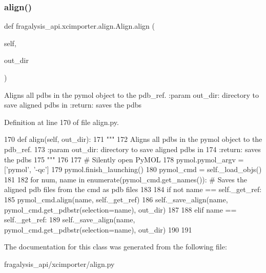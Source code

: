 \subsubsection{\texorpdfstring{align()}{align()}}
{\footnotesize\ttfamily def fragalysis\+\_\+api.\+xcimporter.\+align.\+Align.\+align (\begin{DoxyParamCaption}\item[{}]{self,  }\item[{}]{out\+\_\+dir }\end{DoxyParamCaption})}

\begin{DoxyVerb}Aligns all pdbs in the pymol object to the pdb_ref.
:param out_dir: directory to save aligned pdbs in
:return: saves the pdbs
\end{DoxyVerb}
 

Definition at line 170 of file align.\+py.


\begin{DoxyCode}
170     \textcolor{keyword}{def }align(self, out\_dir):
171         \textcolor{stringliteral}{"""}
172 \textcolor{stringliteral}{        Aligns all pdbs in the pymol object to the pdb\_ref.}
173 \textcolor{stringliteral}{        :param out\_dir: directory to save aligned pdbs in}
174 \textcolor{stringliteral}{        :return: saves the pdbs}
175 \textcolor{stringliteral}{        """}
176 
177         \textcolor{comment}{# Silently open PyMOL}
178         pymol.pymol\_argv = [\textcolor{stringliteral}{'pymol'}, \textcolor{stringliteral}{'-qc'}]
179         pymol.finish\_launching()
180         pymol\_cmd = self.\_load\_objs()
181 
182         \textcolor{keywordflow}{for} num, name \textcolor{keywordflow}{in} enumerate(pymol\_cmd.get\_names()):  \textcolor{comment}{# Saves the aligned pdb files from the cmd as
       pdb files}
183 
184             \textcolor{keywordflow}{if} \textcolor{keywordflow}{not} name == self.\_get\_ref:
185                 pymol\_cmd.align(name, self.\_get\_ref)
186                 self.\_save\_align(name, pymol\_cmd.get\_pdbstr(selection=name), out\_dir)
187 
188             \textcolor{keywordflow}{elif} name == self.\_get\_ref:
189                 self.\_save\_align(name, pymol\_cmd.get\_pdbstr(selection=name), out\_dir)
190 
191 
\end{DoxyCode}


The documentation for this class was generated from the following file\+:\begin{DoxyCompactItemize}
\item 
fragalysis\+\_\+api/xcimporter/align.\+py\end{DoxyCompactItemize}
